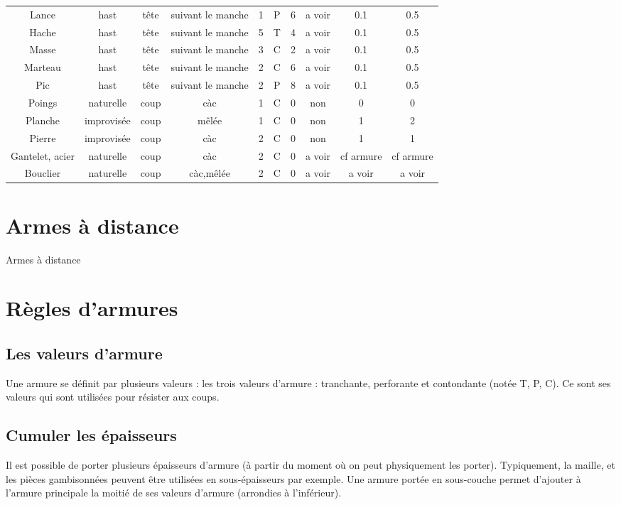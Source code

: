 \documentclass[10pt,a4paper,twocolumn]{book}
\begin{document}
\begin{table*}
\begin{tabular}{cccccccccc}
Lance & hast & tête & suivant le manche & 1 & P & 6 & a voir & 0.1 & 0.5\\
Hache & hast & tête & suivant le manche & 5 & T & 4 & a voir & 0.1 & 0.5\\
Masse & hast & tête & suivant le manche & 3 & C & 2 & a voir & 0.1 & 0.5\\
Marteau & hast & tête & suivant le manche & 2 & C & 6 & a voir & 0.1 & 0.5\\
Pic & hast & tête & suivant le manche & 2 & P & 8 & a voir & 0.1 & 0.5\\
Poings & naturelle & coup & càc & 1 & C & 0 & non & 0 & 0\\
Planche & improvisée & coup & mêlée & 1 & C & 0 & non & 1 & 2\\
Pierre & improvisée & coup & càc & 2 & C & 0 & non & 1 & 1\\
Gantelet, acier & naturelle & coup & càc & 2 & C & 0 & a voir & cf armure & cf armure\\
Bouclier & naturelle & coup & càc,mêlée & 2 & C & 0 & a voir & a voir & a voir\\
\end{tabular}

\end{table*}
\section{Armes à distance}
\begin{table*}
\caption{Armes à distance}
\label{armesadistance}
\end{table*}
\section{Règles d’armures}
\subsection*{Les valeurs d'armure}
Une armure se définit par plusieurs valeurs :  les trois valeurs d’armure : tranchante, perforante et contondante (notée T, P, C). Ce sont ses valeurs qui sont utilisées pour résister aux coups. 
\subsection*{Cumuler les épaisseurs}
Il est possible de porter plusieurs épaisseurs d’armure (à partir du moment où on peut physiquement les porter). Typiquement, la maille,  et les pièces gambisonnées peuvent être utilisées en sous-épaisseurs par exemple.
Une armure portée en sous-couche permet d’ajouter à l’armure principale la moitié de ses valeurs d’armure (arrondies à l’inférieur).
\end{document}

